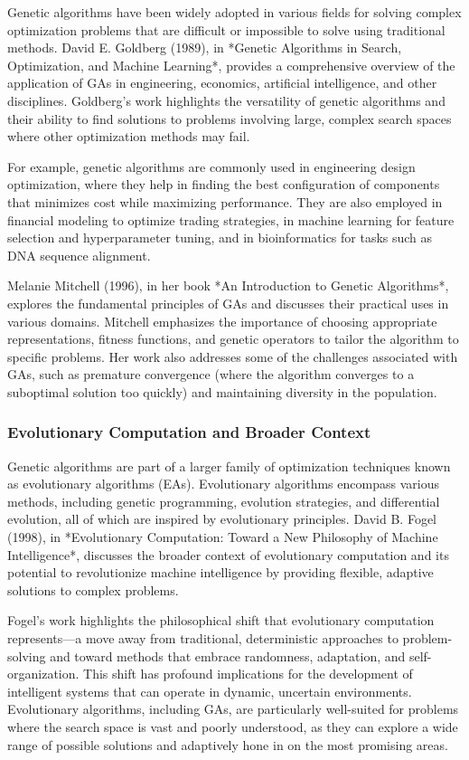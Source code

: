 \documentclass[12pt,twoside]{article}
\begin{document}
Genetic algorithms have been widely adopted in various fields for solving complex optimization problems that are difficult or impossible to solve using traditional methods. David E. Goldberg (1989), in *Genetic Algorithms in Search, Optimization, and Machine Learning*, provides a comprehensive overview of the application of GAs in engineering, economics, artificial intelligence, and other disciplines. Goldberg’s work highlights the versatility of genetic algorithms and their ability to find solutions to problems involving large, complex search spaces where other optimization methods may fail.

For example, genetic algorithms are commonly used in engineering design optimization, where they help in finding the best configuration of components that minimizes cost while maximizing performance. They are also employed in financial modeling to optimize trading strategies, in machine learning for feature selection and hyperparameter tuning, and in bioinformatics for tasks such as DNA sequence alignment.

Melanie Mitchell (1996), in her book *An Introduction to Genetic Algorithms*, explores the fundamental principles of GAs and discusses their practical uses in various domains. Mitchell emphasizes the importance of choosing appropriate representations, fitness functions, and genetic operators to tailor the algorithm to specific problems. Her work also addresses some of the challenges associated with GAs, such as premature convergence (where the algorithm converges to a suboptimal solution too quickly) and maintaining diversity in the population.

\subsubsection{Evolutionary Computation and Broader Context}

Genetic algorithms are part of a larger family of optimization techniques known as evolutionary algorithms (EAs). Evolutionary algorithms encompass various methods, including genetic programming, evolution strategies, and differential evolution, all of which are inspired by evolutionary principles. David B. Fogel (1998), in *Evolutionary Computation: Toward a New Philosophy of Machine Intelligence*, discusses the broader context of evolutionary computation and its potential to revolutionize machine intelligence by providing flexible, adaptive solutions to complex problems.

Fogel’s work highlights the philosophical shift that evolutionary computation represents—a move away from traditional, deterministic approaches to problem-solving and toward methods that embrace randomness, adaptation, and self-organization. This shift has profound implications for the development of intelligent systems that can operate in dynamic, uncertain environments. Evolutionary algorithms, including GAs, are particularly well-suited for problems where the search space is vast and poorly understood, as they can explore a wide range of possible solutions and adaptively hone in on the most promising areas.
\end{document}
